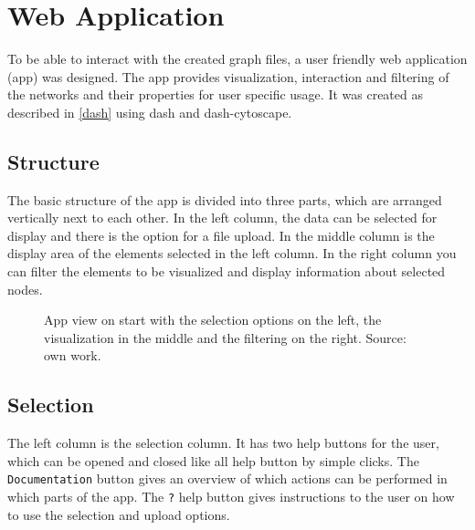 \documentclass[pdftex,12pt,a4paper]{report}
\begin{document}
\section{Web Application}
To be able to interact with the created graph files, a user friendly web application (app) was designed. The app provides visualization, interaction and filtering of the networks and their properties for user specific usage. It was created as described in \ref{dash} using dash and dash-cytoscape.

\subsection{Structure}
The basic structure of the app is divided into three parts, which are arranged vertically next to each other. In the left column, the data can be selected for display and there is the option for a file upload. In the middle column is the display area of the elements selected in the left column. In the right column you can filter the elements to be visualized and display information about selected nodes. 

\begin{figure}[!ht]
\begin{center}
	\caption{App view on start with the selection options on the left, the visualization in the middle and the filtering on the right. Source: own work.}
	\label{webapp}
\end{center}
\end{figure}

\subsection{Selection}
The left column is the selection column. It has two help buttons for the user, which can be opened and closed like all help button by simple clicks. The \texttt{Documentation} button gives an overview of which actions can be performed in which parts of the app.
The \texttt{?} help button gives instructions to the user on how to use the selection and upload options.
\end{document}
